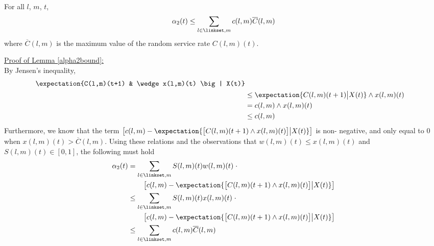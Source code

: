 \begin{Lem} \label{alpha2bound}
For all $l$, $m$, $t$, 
\begin{equation} 
\alpha_2 (t) \leq \sum_{l \in \linkset,m} c(l,m)\overline{C} (l,m)
\end{equation}
where $\overline{C} (l,m)$ is the maximum value of the random service rate $C(l,m)(t)$. 
\end{Lem}
\underline{Proof of Lemma \ref{alpha2bound}:} \\
By Jensen's inequality, 
\begin{align*}
\expectation{C(l,m)(t+1) & \wedge x(l,m)(t) \big| X(t)} \\
& \leq \expectation{C(l,m)(t+1) \big| X(t)}  \wedge x(l,m)(t) \\
&= c(l,m)\wedge x(l,m)(t) \\ 
&\leq c(l,m)
\end{align*}
 Furthermore, we know that the term 
$ \left[ c(l,m)- \expectation{ \big[C(l,m)(t+1)\wedge x(l,m)(t)\big] \big| X(t) }  \right] $
is non- negative, and only equal to $0$ when $x(l,m)(t)>\overline C (l,m)$. 
Using these relations and the observations that $w(l,m)(t) \leq x(l,m)(t)$ and $S(l,m)(t)\in [0,1]$, the following must hold 
\begin{align*}
\alpha_2 (t) & =  \sum_{l \in \linkset,m}  S(l,m)(t)w(l,m)(t) \; \cdot  \\
 & \qquad  \left[ c(l,m)- \expectation{ \big[C(l,m)(t+1)\wedge x(l,m)(t)\big] \big| X(t) }  \right] \\
& \leq \sum_{l \in \linkset,m} S(l,m)(t)x(l,m)(t) \; \cdot \\ 
& \qquad \left[ c(l,m)- \expectation{ \big[C(l,m)(t+1)\wedge x(l,m)(t)\big] \big| X(t) }  \right] \\
& \leq \sum_{l \in \linkset,m} c(l,m) \overline{C}(l,m)
 \end{align*}



